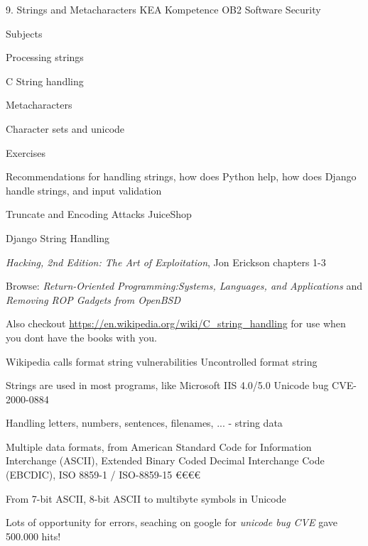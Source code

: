 \documentclass[Screen16to9,17pt]{foils}
\begin{document}
\mytitlepage
{9. Strings and Metacharacters}
{KEA Kompetence OB2 Software Security}


\begin{list1}
\item Subjects
\begin{list2}
\item Processing strings
\item C String handling
\item Metacharacters
\item Character sets and unicode
\end{list2}
\item Exercises
\begin{list2}
\item Recommendations for handling strings, how does Python help, how does Django handle strings, and input validation
\item Truncate and Encoding Attacks JuiceShop
\item Django String Handling
\end{list2}
\end{list1}


\begin{list1}
\item \emph{Hacking, 2nd Edition: The Art of Exploitation}, Jon Erickson chapters 1-3
\item Browse: \emph{Return-Oriented Programming:Systems, Languages, and Applications} and \emph{Removing ROP Gadgets from OpenBSD}
\end{list1}

Also checkout \url{https://en.wikipedia.org/wiki/C_string_handling}
for use when you dont have the books with you.

Wikipedia calls format string vulnerabilities Uncontrolled format string 



\begin{list1}
\item Strings are used in most programs, like Microsoft IIS 4.0/5.0 Unicode bug CVE-2000-0884
\item Handling letters, numbers, sentences, filenames, ... - string data
\item Multiple data formats, from American Standard Code for Information Interchange (ASCII), Extended Binary Coded Decimal Interchange Code (EBCDIC), ISO 8859-1 / ISO-8859-15 €€€€
\item From 7-bit ASCII, 8-bit ASCII to multibyte symbols in Unicode
\item Lots of opportunity for errors, seaching on google for \emph{unicode bug CVE} gave 500.000 hits!
\end{list1}
\end{document}
